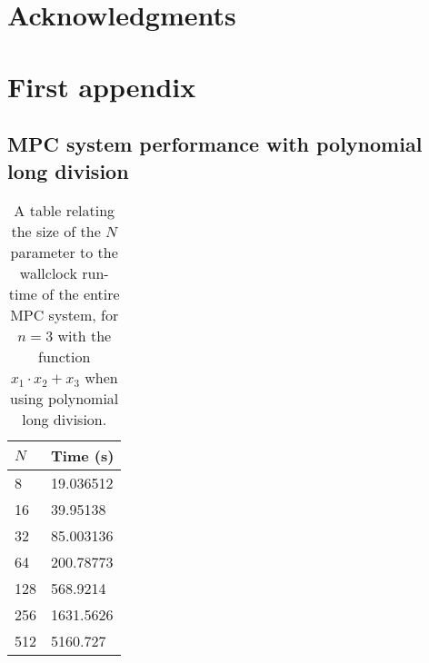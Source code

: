 \documentclass[11pt,openright]{report}
\theoremstyle{definition}
\begin{document}


\chapter*{Acknowledgments}




\cleardoublepage
{}




\cleardoublepage
\appendix
\chapter{First appendix}

\section{MPC system performance with polynomial long division}

\begin{table}[h]
  \centering
  \begin{tabular}{l|l}
      $N$  & Time (s)   \\ 
      \hline
      8   & 19.036512 \\
      16  & 39.95138 \\
      32  & 85.003136 \\
      64  & 200.78773 \\
      128 & 568.9214 \\
      256 & 1631.5626 \\
      512 & 5160.727
  \end{tabular}
  \caption{A table relating the size of the $N$ parameter to the wallclock run-time of the entire MPC system, for $n = 3$ with the function $x_1 \cdot x_2 + x_3$ when using polynomial long division.}
  \label{tab:polynomial-long-division-performance}
\end{table}
\end{document}

